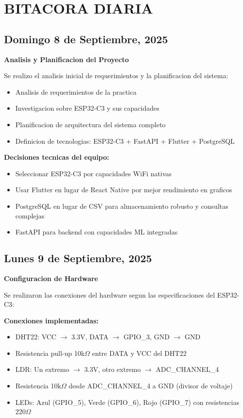 \documentclass[11pt,letterpaper]{article}
\begin{document}
\section{BITACORA DIARIA}

\subsection{Domingo 8 de Septiembre, 2025}
\textbf{Analisis y Planificacion del Proyecto}

Se realizo el analisis inicial de requerimientos y la planificacion del sistema:
\begin{itemize}
    \item Analisis de requerimientos de la practica
    \item Investigacion sobre ESP32-C3 y sus capacidades
    \item Planificacion de arquitectura del sistema completo
    \item Definicion de tecnologias: ESP32-C3 + FastAPI + Flutter + PostgreSQL
\end{itemize}

\textbf{Decisiones tecnicas del equipo:}
\begin{itemize}
    \item Seleccionar ESP32-C3 por capacidades WiFi nativas
    \item Usar Flutter en lugar de React Native por mejor rendimiento en graficos
    \item PostgreSQL en lugar de CSV para almacenamiento robusto y consultas complejas
    \item FastAPI para backend con capacidades ML integradas
\end{itemize}

\subsection{Lunes 9 de Septiembre, 2025}
\textbf{Configuracion de Hardware}

Se realizaron las conexiones del hardware segun las especificaciones del ESP32-C3:

\textbf{Conexiones implementadas:}
\begin{itemize}
    \item DHT22: VCC $\rightarrow$ 3.3V, DATA $\rightarrow$ GPIO\_3, GND $\rightarrow$ GND
    \item Resistencia pull-up 10k$\Omega$ entre DATA y VCC del DHT22
    \item LDR: Un extremo $\rightarrow$ 3.3V, otro extremo $\rightarrow$ ADC\_CHANNEL\_4
    \item Resistencia 10k$\Omega$ desde ADC\_CHANNEL\_4 a GND (divisor de voltaje)
    \item LEDs: Azul (GPIO\_5), Verde (GPIO\_6), Rojo (GPIO\_7) con resistencias 220$\Omega$
\end{itemize}
\end{document}

